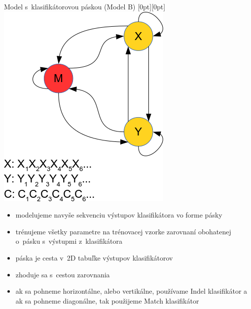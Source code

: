 \documentclass[xcolor=dvipsnames, compress, 12pt]{beamer}
\newcommand{\lenitem}[2][.6\linewidth]{\parbox[t]{#1}{\strut #2\strut}}
\theoremstyle{definition}
\begin{document}


\begin{frame}{Model s~klasifikátorovou páskou (Model B)}
  \mbox{}\hfill\raisebox{-\height}[0pt][0pt]{
   \includegraphics[width=.30\textwidth]{images/model_clf_paska}
   }
  \vspace*{-\baselineskip}

  \begin{itemize}
      \item \lenitem{modelujeme navyše sekvenciu výstupov klasifikátora vo forme pásky}
      \item \lenitem{trénujeme všetky parametre na trénovacej vzorke zarovnaní obohatenej o~pásku s~výstupmi z~klasifikátora}
  \end{itemize}

  \begin{itemize}
    \item \lenitem{páska je cesta v~2D tabuľke výstupov klasifikátorov}
    \item \lenitem{zhoduje sa s~cestou zarovnania}
    \item ak sa pohneme horizontálne, alebo vertikálne, používame Indel klasifikátor a ak sa pohneme diagonálne, tak použijeme Match klasifikátor
  \end{itemize}
\end{frame}
\end{document}

